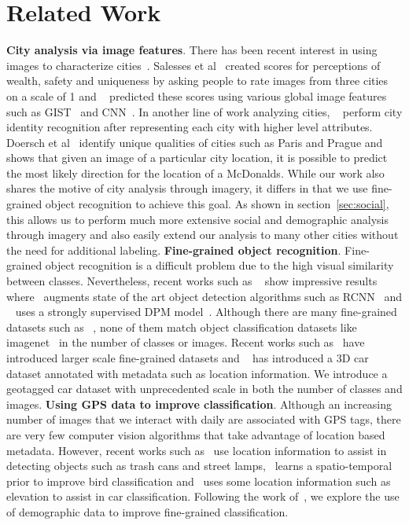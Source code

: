 \documentclass[10pt,twocolumn,letterpaper]{article}
\begin{document}
\section{Related Work}
\label{sec:related}
\textbf{City analysis via image features}. There has been recent interest in using images to characterize cities~\cite{mit_plos_1,tamara,paris,antonio,mit_cvpr,mcdonalds}. Salesses et al~\cite{mit_plos_1} created scores for perceptions of wealth, safety and uniqueness by asking people to rate images from three cities on a scale of 1 and ~\cite{mit_cvpr,tamara} predicted these scores using various global image features such as GIST~\cite{gist} and CNN~\cite{cnn}. In another line of work analyzing cities, ~\cite{antonio} perform city identity recognition after representing each city with higher level attributes. Doersch et al~\cite{paris} identify unique qualities of cities such as Paris and Prague and~\cite{mcdonalds} shows that given an image of a particular city location, it is possible to predict the most likely direction for the location of a McDonalds. While our work also shares the motive of city analysis through imagery, it differs in that we use fine-grained object recognition to achieve this goal. As shown in section~\ref{sec:social}, this allows us to perform much more extensive social and demographic analysis through imagery and also easily extend our analysis to many other cities without the need for additional labeling. \newline\newline
\textbf{Fine-grained object recognition}. Fine-grained object recognition is a difficult problem due to the high visual similarity between classes. Nevertheless, recent works such as ~\cite{ning,branson} show impressive results where~\cite{ning} augments state of the art object detection algorithms such as RCNN~\cite{rcnn} and ~\cite{branson} uses a strongly supervised DPM model~\cite{strong_DPM}. Although there are many fine-grained datasets such as ~\cite{birds,dogs,cars,nyc3d,birdsnap}, none of them match object classification datasets like imagenet~\cite{imagenet} in the number of classes or images. Recent works such as~\cite{birdsnap} have introduced larger scale fine-grained datasets and ~\cite{nyc3d} has introduced a 3D car dataset annotated with metadata such as location information. We introduce a geotagged car dataset with unprecedented scale in both the number of classes and images.\newline\newline
\textbf{Using GPS data to improve classification}. Although an increasing number of images that we interact with daily are associated with GPS tags, there are very few computer vision algorithms that take advantage of location based metadata. However, recent works such as~\cite{amir} use location information to assist in detecting objects such as trash cans and street lamps,~\cite{birdsnap} learns a spatio-temporal prior to improve bird classification and~\cite{nyc3d} uses some location information such as elevation to assist in car classification. Following the work of~\cite{birdsnap}, we explore the use of demographic data to improve fine-grained classification.
\end{document}
